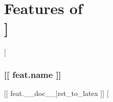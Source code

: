 \documentclass[letterpaper,10pt,twoside,twocolumn,openany]{dndbook}
\begin{document}
\chapter{Features of \\  [[ character.name ]]}

[%
\subsection*{ [[ feat.name ]] }
[[ feat.__doc__|rst_to_latex ]]	
[%





\end{document}
